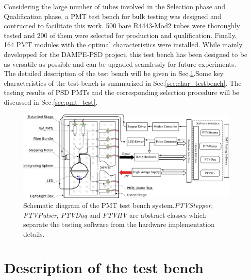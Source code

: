 \documentclass[5p, times]{elsarticle}
\begin{document}
Considering the large number of tubes involved in the Selection phase and Qualification phase, a PMT test bench for bulk testing was designed and contructed to facilitate this work.
500 bare R4443-Mod2 tubes were thoroughly tested and 200 of them were selected for production and qualification.
Finally, 164 PMT modules with the optimal characteristics were installed.
While mainly developped for the DAMPE-PSD project, this test bench has been designed to be as versatile as possible and can be upgaded seamlessly for future experiments.
The detailed description of the test bench will be given in Sec.\ref{sec:description}.Some key characteristics of the test bench is summarized in Sec.\ref{sec:char_testbench}.
The testing results of PSD PMTs and the corresponding selection procedure will be discussed in Sec.\ref{sec:pmt_test}.

\begin{figure}[b]
 \centering
 \includegraphics[width=140mm]{testbench_overview}
\caption{Schematic diagram of the PMT test bench system.\textit{PTVStepper}, \textit{PTVPulser}, \textit{PTVDaq} and \textit{PTVHV} are abstract classes which separate the testing software from the hardware implementation details.}
\label{fig:testbench_overveiw}
\end{figure}

\section{Description of the test bench}
\label{sec:description}
\end{document}
